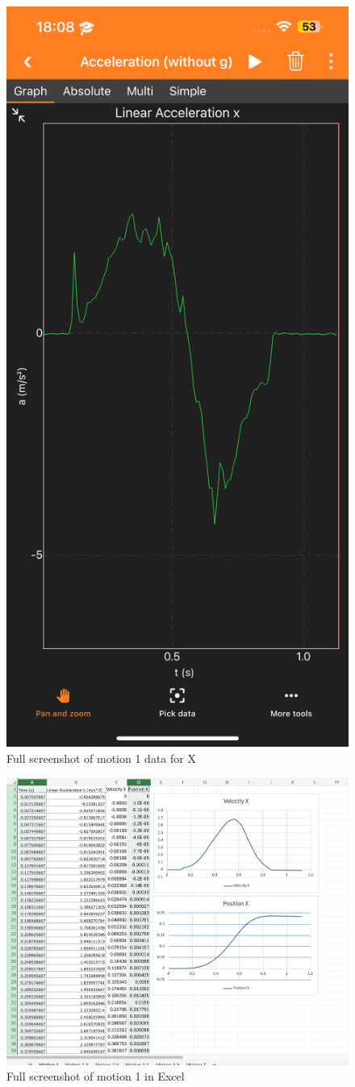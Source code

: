 \documentclass[idxtotoc,hyperref,openany]{labbook} %
\begin{document}
\begin{figure}[H] %
\begin{center}
\includegraphics[width=.55\linewidth]{images/Lab.03/Lab03Motion1X.PNG}
\end{center}
\caption{Full screenshot of motion 1 data for X}
\label{fig:Lab03-Motion1-X}
\end{figure}

\begin{figure}[H] %
\begin{center}
\includegraphics[width=1.3\linewidth]{images/Lab.03/Lab03Motion1Excel.png}
\end{center}
\caption{Full screenshot of motion 1 in Excel}
\label{fig:Lab03-Motion1-Excel}
\end{figure}
\end{document}
